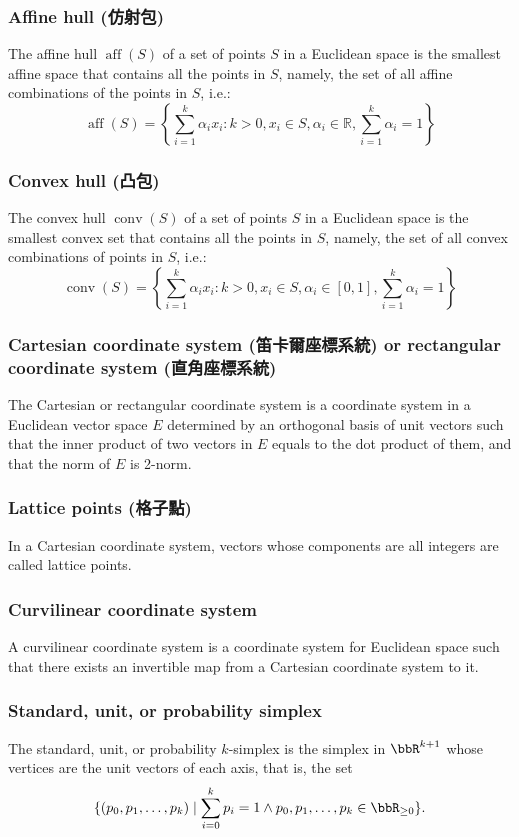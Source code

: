 \documentclass[a4paper,12pt]{report}
\begin{document}
\subsubsection{Affine hull (仿射包)}
The affine hull $\operatorname{aff} (S)$ of a set of points $S$ in a Euclidean space is the smallest affine space that contains all the points in $S$, namely, the set of all affine combinations of the points in $S$, i.e.:
\[\operatorname{aff}(S)=\left\{\sum _{i=1}^k\alpha _ix_i\colon k>0,x_i\in S,\alpha _i\in\mathbb{R},\sum _{i=1}^k\alpha _i=1\right\}\]
\subsubsection{Convex hull (凸包)}
The convex hull $\operatorname{conv} (S)$ of a set of points $S$ in a Euclidean space is the smallest convex set that contains all the points in $S$, namely, the set of all convex combinations of points in $S$, i.e.:
\[\operatorname{conv}(S)=\left\{\sum _{i=1}^k\alpha _ix_i\colon k>0,x_i\in S,\alpha _i\in [0,1],\sum _{i=1}^k\alpha _i=1\right\}\]
\subsubsection{Cartesian coordinate system (笛卡爾座標系統) or rectangular coordinate system (直角座標系統)}
The Cartesian or rectangular coordinate system is a coordinate system in a Euclidean vector space $E$ determined by an orthogonal basis of unit vectors such that the inner product of two vectors in $E$ equals to the dot product of them, and that the norm of $E$ is 2-norm.
\subsubsection{Lattice points (格子點)}
In a Cartesian coordinate system, vectors whose components are all integers are called lattice points.
\subsubsection{Curvilinear coordinate system}
A curvilinear coordinate system is a coordinate system for Euclidean space such that there exists an invertible map from a Cartesian coordinate system to it.
\subsubsection{Standard, unit, or probability simplex}
The standard, unit, or probability $k$-simplex is the simplex in $\bbR^{k+1}$ whose vertices are the unit vectors of each axis, that is, the set
\[\{(p_0,p_1,\ldots,p_k)\mid\sum_{i=0}^kp_i=1\land p_0,p_1,\ldots,p_k\in\bbR_{\ge0}\}.\]
\end{document}
